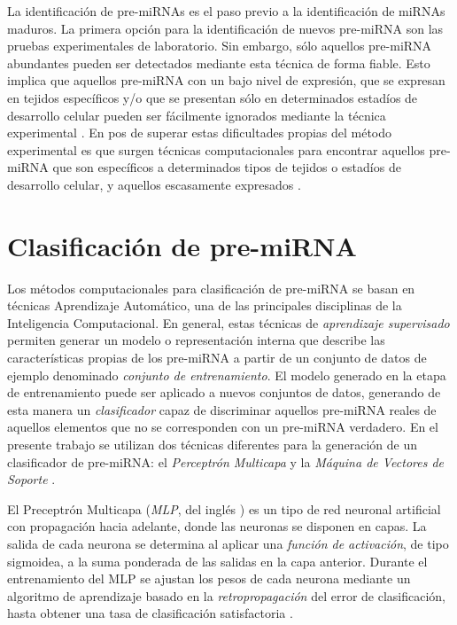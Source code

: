 \documentclass[12pt,bibliography=oldstyle,DIV=12,parskip=half-]{scrreprt}
\begin{document}
La identificación de pre-miRNAs es el paso previo a la identificación
de miRNAs maduros. La primera opción para la identificación de nuevos
pre-miRNA son las pruebas experimentales de laboratorio. Sin embargo,
sólo aquellos pre-miRNA abundantes pueden ser detectados mediante esta
técnica de forma fiable. Esto implica que aquellos pre-miRNA con un
bajo nivel de expresión, que se expresan en tejidos específicos y/o
que se presentan sólo en determinados estadíos de desarrollo celular
pueden ser fácilmente ignorados mediante la técnica experimental
\cite{ding}\cite{xu}. En pos de superar estas dificultades propias del
método experimental es que surgen técnicas computacionales para
encontrar aquellos pre-miRNA que son específicos a determinados tipos
de tejidos o estadíos de desarrollo celular, y aquellos escasamente
expresados \cite{sheng}\cite{xu}.
%
%
%
\section{Clasificación de pre-miRNA}
%
Los métodos computacionales para clasificación de pre-miRNA se basan
en técnicas Aprendizaje Automático, una de las principales disciplinas
de la Inteligencia Computacional.  En general, estas técnicas de
\emph{aprendizaje supervisado} permiten generar un modelo o
representación interna que describe las características propias de los
pre-miRNA a partir de un conjunto de datos de ejemplo denominado
\emph{conjunto de entrenamiento}.  El modelo generado en la etapa de
entrenamiento puede ser aplicado a nuevos conjuntos de datos,
generando de esta manera un \emph{clasificador} capaz de discriminar
aquellos pre-miRNA reales de aquellos elementos que no se corresponden
con un pre-miRNA verdadero. En el presente trabajo se utilizan dos
técnicas diferentes para la generación de un clasificador de
pre-miRNA: el \emph{Perceptrón Multicapa} \cite{mlp1}\cite{mlp2} y la
\emph{Máquina de Vectores de Soporte} \cite{svm}.

El Preceptrón Multicapa (\emph{MLP}, del inglés ) es un tipo de red neuronal artificial con propagación
hacia adelante, donde las neuronas se disponen en capas. La salida de
cada neurona se determina al aplicar una \emph{función de activación},
de tipo sigmoidea, a la suma ponderada de las salidas en la capa
anterior. Durante el entrenamiento del MLP se ajustan los pesos de
cada neurona mediante un algoritmo de aprendizaje basado en la
\emph{retropropagación} del error de clasificación, hasta obtener una
tasa de clasificación satisfactoria \cite{jain}.
\end{document}
